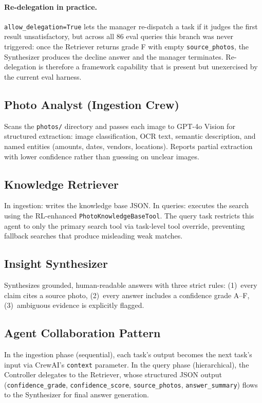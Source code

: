 \documentclass[11pt,letterpaper]{article}
\begin{document}
\paragraph{Re-delegation in practice.} \texttt{allow\_delegation=True} lets the manager re-dispatch a task if it judges the first result unsatisfactory, but across all 86 eval queries this branch was never triggered: once the Retriever returns grade F with empty \texttt{source\_photos}, the Synthesizer produces the decline answer and the manager terminates. Re-delegation is therefore a framework capability that is present but unexercised by the current eval harness.

\subsection{Photo Analyst (Ingestion Crew)}

Scans the \texttt{photos/} directory and passes each image to GPT-4o Vision for structured extraction: image classification, OCR text, semantic description, and named entities (amounts, dates, vendors, locations). Reports partial extraction with lower confidence rather than guessing on unclear images.

\subsection{Knowledge Retriever}

In ingestion: writes the knowledge base JSON. In queries: executes the search using the RL-enhanced \texttt{PhotoKnowledgeBaseTool}. The query task restricts this agent to only the primary search tool via task-level tool override, preventing fallback searches that produce misleading weak matches.

\subsection{Insight Synthesizer}

Synthesizes grounded, human-readable answers with three strict rules: (1)~every claim cites a source photo, (2)~every answer includes a confidence grade A--F, (3)~ambiguous evidence is explicitly flagged.

\subsection{Agent Collaboration Pattern}

In the ingestion phase (sequential), each task's output becomes the next task's input via CrewAI's \texttt{context} parameter. In the query phase (hierarchical), the Controller delegates to the Retriever, whose structured JSON output (\texttt{confidence\_grade}, \texttt{confidence\_score}, \texttt{source\_photos}, \texttt{answer\_summary}) flows to the Synthesizer for final answer generation.
\end{document}
